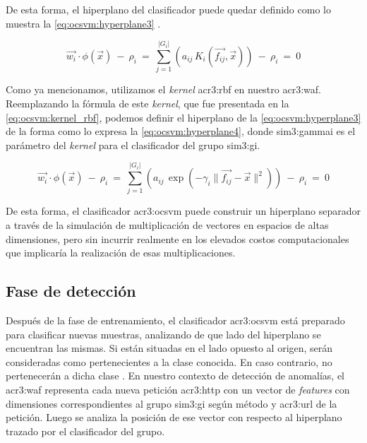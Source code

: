 De esta forma, el hiperplano del clasificador puede quedar definido como
lo muestra la \autoref{eq:ocsvm:hyperplane3}
\citep{aggarwal2013outlier}. %

\begin{equation}
    \label{eq:ocsvm:hyperplane3}
    \vec{w_{i}} \cdot \phi(\vec{x})
    \ - \
    \rho_{i}
    \ = \
    \sum_{j=1}^{\lvert G_{i} \rvert}
    \left(
        a_{ij} \, K_{i}(\vec{f_{ij}}, \vec{x})
    \right)
    \ - \
    \rho_{i}
    \ = \
    0
\end{equation}

Como ya mencionamos, utilizamos el \textit{kernel} \gls{acr3:rbf} en
nuestro \gls{acr3:waf}. Reemplazando la fórmula de este \textit{kernel},
que fue presentada en la \autoref{eq:ocsvm:kernel_rbf}, podemos definir
el hiperplano de la \autoref{eq:ocsvm:hyperplane3} de la forma como lo
expresa la \autoref{eq:ocsvm:hyperplane4}, donde \gls{sim3:gammai} es el
parámetro del \textit{kernel} para el clasificador del grupo \gls{sim3:gi}.

\begin{equation}
    \label{eq:ocsvm:hyperplane4}
    \vec{w_{i}} \cdot \phi(\vec{x})
    \ - \
    \rho_{i}
    \ = \
    \sum_{j=1}^{\lvert G_{i} \rvert}
    \left(
        a_{ij} \,
        \exp(
            - \gamma_{i} \lVert \vec{f_{ij}} - \vec{x} \lVert^2
        )
    \right)
    \ - \
    \rho_{i}
    \ = \
    0
\end{equation}

De esta forma, el clasificador \gls{acr3:ocsvm} puede construir un
hiperplano separador a través de la simulación de multiplicación de
vectores en espacios de altas dimensiones, pero sin incurrir
realmente en los elevados costos computacionales que implicaría la
realización de esas multiplicaciones.


\subsection{Fase de detección}

Después de la fase de entrenamiento, el clasificador \gls{acr3:ocsvm}
está preparado para clasificar nuevas muestras, analizando de que lado
del hiperplano se encuentran las mismas. Si están situadas en el lado
opuesto al origen, serán consideradas como pertenecientes a la clase
conocida. En caso contrario, no pertenecerán a dicha clase
\citep{perdisci2006using}. %
En nuestro contexto de detección de anomalías, el \gls{acr3:waf} representa
cada nueva petición \gls{acr3:http} con un vector de \textit{features}
con dimensiones correspondientes al grupo \gls{sim3:gi} según método y
\gls{acr3:url} de la petición. Luego se analiza la posición de ese vector
con respecto al hiperplano trazado por el clasificador del grupo.

